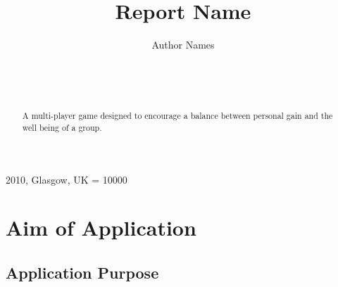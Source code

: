\documentclass{sig-alt-release2}
\begin{document}
\newcommand{\todo}[1]{\textcolor{red}{#1}}
\def\newblock{\hskip .11em plus .33em minus .07em}

 {2010, Glasgow, UK} 
\widowpenalty = 10000

\title{{Report Name}}

\author{
\alignauthor
Author Names\\
	   \\
      \\
      \\
}
\maketitle

\begin{abstract}
A multi-player game designed to encourage a balance between personal gain and the well being of a group.

\end{abstract}

\section{Aim of Application}

\subsection{Application Purpose}
\end{document}

